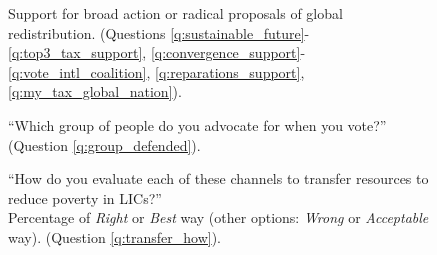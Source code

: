 \documentclass[12pt,english]{article}
\begin{document}
\begin{bibunit}
\begin{figure}[h!]
\end{figure}
\begin{figure}[h!]
    \caption[Support for broad or radical global redistribution]{Support for broad action or radical proposals of global redistribution. \hfill (Questions \ref{q:sustainable_future}-\ref{q:top3_tax_support}, \ref{q:convergence_support}-\ref{q:vote_intl_coalition}, \ref{q:reparations_support}, \ref{q:my_tax_global_nation}).
    }\label{fig:radical_redistr_share} 
\end{figure}
\begin{figure}[h!]
    \caption[Moral circle]{``Which group of people do you advocate for when you vote?'' (Question \ref{q:group_defended}).
    }\label{fig:group_defended}
\end{figure}
\begin{figure}[h!]
    \caption[\textit{Right} or \textit{Best} way to transfer resources to LICs (global average)]{``How do you evaluate each of these channels to transfer resources to reduce poverty in LICs?''\\ Percentage of \textit{Right} or \textit{Best} way (other options: \textit{Wrong} or \textit{Acceptable} way). (Question \ref{q:transfer_how}).
}
\end{figure}
\end{bibunit}
\end{document}
